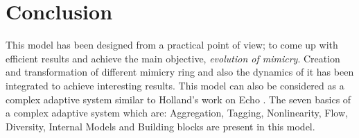 \section{Conclusion}
This model has been designed from a practical point of view; to come up with efficient results and achieve the main objective, \textit{evolution of mimicry}. Creation and transformation of different mimicry ring and also the dynamics of it has been integrated to achieve interesting results. This model can also be considered as a complex adaptive system similar to Holland's work on Echo \cite{holland1996}. The seven basics of a complex adaptive system which are: Aggregation, Tagging, Nonlinearity, Flow, Diversity, Internal Models and Building blocks \cite{holland1996} are present in this model.
